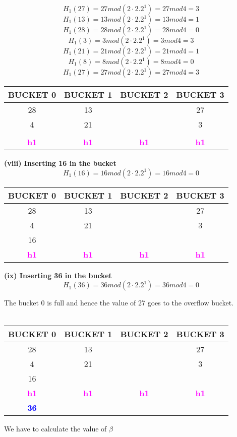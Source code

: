 \[H_1(27) = 27 mod (2 \cdot 2.2^1)  = 27 mod 4 = 3\]
\[H_1(13) = 13 mod (2 \cdot 2.2^1)  = 13 mod 4 = 1\]
\[H_1(28) = 28 mod (2 \cdot 2.2^1)  = 28 mod 4 = 0\]
\[H_1(3) = 3 mod (2 \cdot 2.2^1)  = 3 mod 4 = 3\]
\[H_1(21) = 21 mod (2 \cdot 2.2^1)  = 21 mod 4 = 1\]
\[H_1(8) = 8 mod (2 \cdot 2.2^1)  = 8 mod 4 = 0\]
\[H_1(27) = 27 mod (2 \cdot 2.2^1)  = 27 mod 4 = 3\]
\begin{center}
\begin{tabular}{ |c|c|c|c| } 
 \hline
 \textbf{\color{red}{P}} BUCKET 0 & BUCKET 1 & BUCKET 2 & BUCKET 3\\ [0.5ex] 
 \hline\hline
 \hline
  28 & 13 &  &27\\ 
   4 & 21 &  &3\\
    &  &  &\\
 \hline
 \hline
\textbf{\textcolor{magenta}{h1}} & \textbf{\textcolor{magenta}{h1}}& \textbf{\textcolor{magenta}{h1}}&\textbf{\textcolor{magenta}{h1}}\\ [0.5ex] 
 \hline
\end{tabular}
\end{center}
\textbf{(viii) Inserting 16 in the bucket}
\[H_1(16) = 16 mod (2 \cdot 2.2^1)  = 16 mod 4 = 0\]
\begin{center}
\begin{tabular}{ |c|c|c|c| } 
 \hline
 \textbf{\color{red}{P}} BUCKET 0 & BUCKET 1 & BUCKET 2 & BUCKET 3\\ [0.5ex] 
 \hline\hline
 \hline
  28 & 13 &  &27\\ 
   4 & 21 &  &3\\
    16 &  &  &\\
 \hline
 \hline
\textbf{\textcolor{magenta}{h1}} & \textbf{\textcolor{magenta}{h1}}& \textbf{\textcolor{magenta}{h1}}&\textbf{\textcolor{magenta}{h1}}\\ [0.5ex] 
 \hline
\end{tabular}
\end{center}
\textbf{(ix) Inserting 36 in the bucket}
\[H_1(36) = 36 mod (2 \cdot 2.2^1)  = 36 mod 4 = 0\]

The bucket 0 is full and hence the value of 27 goes to the overflow bucket.
\\
\\
\begin{center}
\begin{tabular}{ |c|c|c|c| } 
 \hline
 \textbf{\color{red}{P}} BUCKET 0 & BUCKET 1 & BUCKET 2 & BUCKET 3\\ [0.5ex] 
 \hline\hline
 \hline
  28 & 13 &  &27\\ 
   4 & 21 &  &3\\
    16 &  &  &\\
 \hline
 \hline
\textbf{\textcolor{magenta}{h1}} & \textbf{\textcolor{magenta}{h1}}& \textbf{\textcolor{magenta}{h1}}&\textbf{\textcolor{magenta}{h1}}\\ [0.5ex] 
 \hline
 \textbf{\textcolor{blue}{36}}
\end{tabular}
\end{center}
We have to calculate the value of $\beta$

